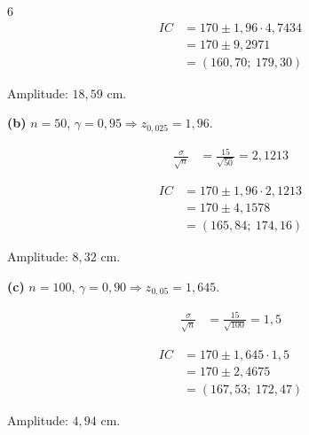 \documentclass[8pt, a4paper, landscape]{extarticle}
\begin{document}
\begin{multicols}{6}
\begin{equation*}
\begin{split}
IC &= 170 \pm 1,96 \cdot 4,7434 \\
   &= 170 \pm 9,2971 \\
   &= (160,70;\ 179,30)
\end{split}
\end{equation*}

Amplitude: $18,59$ cm.

\vspace{0.2cm}

\textbf{(b)} $n = 50$, $\gamma = 0,95 \Rightarrow z_{0,025} = 1,96$.

\begin{equation*}
\begin{split}
\frac{\sigma}{\sqrt{n}} &= \frac{15}{\sqrt{50}} = 2,1213
\end{split}
\end{equation*}

\begin{equation*}
\begin{split}
IC &= 170 \pm 1,96 \cdot 2,1213 \\
   &= 170 \pm 4,1578 \\
   &= (165,84;\ 174,16)
\end{split}
\end{equation*}

Amplitude: $8,32$ cm.

\vspace{0.2cm}

\textbf{(c)} $n = 100$, $\gamma = 0,90 \Rightarrow z_{0,05} = 1,645$.

\begin{equation*}
\begin{split}
\frac{\sigma}{\sqrt{n}} &= \frac{15}{\sqrt{100}} = 1,5
\end{split}
\end{equation*}

\begin{equation*}
\begin{split}
IC &= 170 \pm 1,645 \cdot 1,5 \\
   &= 170 \pm 2,4675 \\
   &= (167,53;\ 172,47)
\end{split}
\end{equation*}

Amplitude: $4,94$ cm.

\vspace{0.2cm}


\end{multicols}
\end{document}
